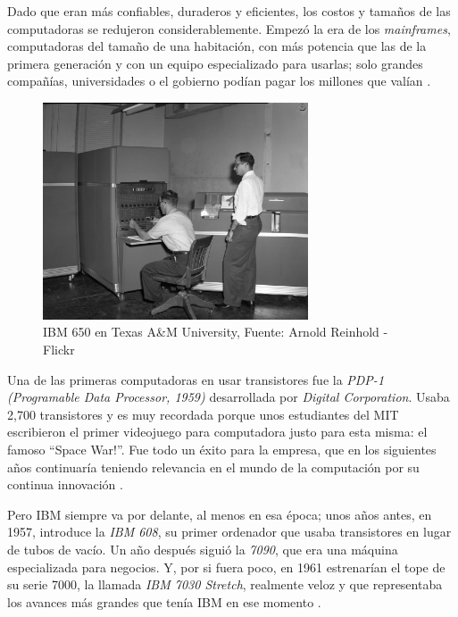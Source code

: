\documentclass[letterpaper,12pt,oneside]{book}
\begin{document}
        Dado que eran más confiables, duraderos y eficientes, los costos
		y tamaños de las computadoras se redujeron considerablemente. Empezó la era de los \textit{mainframes}, computadoras del tamaño
		de una habitación, con más potencia que las de la primera generación y con un equipo especializado para usarlas; solo grandes compañías, universidades o
		el gobierno podían pagar los millones que valían \cite{oregan_brief_2012,tanenbaum_modern_2002}.
		
		\begin{figure}
		    \centering
		    \includegraphics[width=0.7\textwidth]{media/Historia/Wikipedia_IBM_650_at_Texas_A&M.jpeg}
		    \caption{IBM 650 en Texas A\&M University, Fuente: Arnold Reinhold - Flickr} %
	    	\label{fig:ibm650}
		\end{figure}

		
		Una de las primeras computadoras en usar transistores fue la \textit{PDP-1 (Programable Data Processor, 1959)} desarrollada por \textit{Digital Corporation}. Usaba
		2,700 transistores y es muy recordada porque unos estudiantes del MIT escribieron el primer videojuego para computadora justo para esta misma: el famoso
		``Space War!''. Fue todo un éxito para la empresa, que en los siguientes años continuaría teniendo relevancia en el mundo de la computación
		por su continua innovación \cite{oregan_brief_2012}.
  
        Pero IBM siempre va por delante, al menos en esa época; unos años antes, en 1957, introduce la \textit{IBM 608}, su primer ordenador
		que usaba transistores en lugar de tubos de vacío. Un año después siguió la \textit{7090}, que era una máquina especializada para negocios. Y, por si fuera poco,
		en 1961 estrenarían el tope de su serie 7000, la llamada \textit{IBM 7030 Stretch}, realmente veloz y que representaba los avances más grandes
		que tenía IBM en ese momento \cite{oregan_brief_2012,computer_history_museum_computers_nodate}.
		
\end{document}
